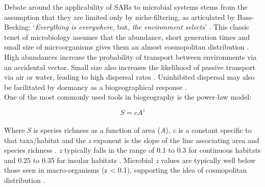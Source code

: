 \noindent Debate around the applicability of SARs to microbial systems stems from the assumption that they are limited only by niche-filtering, as articulated by Bass-Becking: `\textit{Everything is everywhere}, but, \textit{the environment selects}' \cite{baas1934geobiologie}. This classic tenet of microbiology assumes that the abundance, short generation times and small size of microorganisms gives them an almost cosmopolitan distribution \cite{GreenJessica2006Ssom}. High abundances increase the probability of transport between environments via an accidental vector. Small size also increases the likelihood of passive transport via air or water, leading to high dispersal rates \cite{GreenJessica2006Ssom}. Uninhibited dispersal may also be facilitated by dormancy as a biogeographical response \cite{LoceyKennethJ2010Stbw}. \\

\noindent One of the most commonly used tools in biogeography is the power-law model:

\begin{equation}
S=cA^{z}
\end{equation}\\

\noindent Where \textit{S} is species richness as a function of area (\textit{A}), \textit{c} is a constant specific to that taxa/habitat and the \textit{z} exponent is the slope of the line associating area and species richness \cite{darcy2018island}. \textit{z} typically falls in the range of 0.1 to 0.3 for continuous habitats and 0.25 to 0.35 for insular habitats \cite{GreenJessica2006Ssom}. Microbial \textit{z} values are typically well below those seen in macro-organisms (z < 0.1), supporting the idea of cosmopolitan distribution \cite{GreenJessica2006Ssom}. \\

